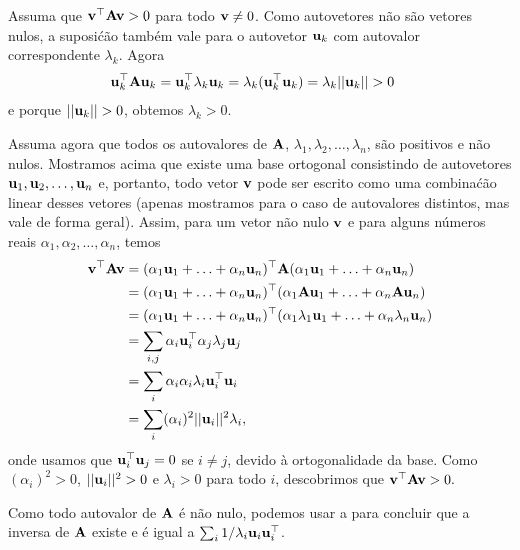 \begin{exenumerate}
    \begin{solution}
        
        Assuma que $\mathbf{v}^\top \mathbf{A}\mathbf{v} > 0$ para todo $\mathbf{v} \neq 0$. Como autovetores n\~ao s\~ao
        vetores nulos, a suposi\'c\~ao tamb\'em vale para o autovetor $\mathbf{u}_k$ com
        autovalor correspondente $\lambda_k$. Agora
        \begin{align}
            \mathbf{u}_k^\top \mathbf{A}\mathbf{u}_k &= \mathbf{u}_k^\top\lambda_k\mathbf{u}_k = \lambda_k(\mathbf{u}_k^\top\mathbf{u}_k) = \lambda_k||\mathbf{u}_k|| > 0
        \end{align}
        e porque $||\mathbf{u}_k|| > 0$, obtemos $\lambda_k > 0$.
        
        Assuma agora que todos os autovalores de $\mathbf{A}$, $\lambda_1, \lambda_2, \ldots, \lambda_n$, s\~ao positivos e n\~ao nulos. Mostramos acima que existe uma base ortogonal consistindo de autovetores $\mathbf{u}_1, \mathbf{u}_2, \ldots, \mathbf{u}_n$ e, portanto, todo vetor $\mathbf{v}$ pode ser escrito como uma
        combina\'c\~ao linear desses vetores (apenas mostramos para o caso de autovalores distintos, mas vale de forma geral). Assim, para um vetor n\~ao nulo $\mathbf{v}$ e para alguns n\'umeros reais $\alpha_1, \alpha_2, \ldots, \alpha_n$, temos
        \begin{align}
            \mathbf{v}^\top\mathbf{A}\mathbf{v} &= (\alpha_1\mathbf{u}_1 + \ldots + \alpha_n\mathbf{u}_n)^\top \mathbf{A}(\alpha_1\mathbf{u}_1 + \ldots + \alpha_n\mathbf{u}_n) \\
            &= (\alpha_1\mathbf{u}_1 + \ldots + \alpha_n\mathbf{u}_n)^\top(\alpha_1\mathbf{A}\mathbf{u}_1 + \ldots + \alpha_n\mathbf{A}\mathbf{u}_n) \\
            &= (\alpha_1\mathbf{u}_1 + \ldots + \alpha_n\mathbf{u}_n)^\top(\alpha_1\lambda_1\mathbf{u}_1 + \ldots + \alpha_n\lambda_n\mathbf{u}_n) \\
            &= \sum_{i,j} \alpha_i\mathbf{u}_i^\top\alpha_j\lambda_j\mathbf{u}_j \\
            &= \sum_i \alpha_i\alpha_i\lambda_i\mathbf{u}_i^\top\mathbf{u}_i \\
            &= \sum_i (\alpha_i)^2||\mathbf{u}_i||^2\lambda_i,
        \end{align}
        onde usamos que $\mathbf{u}_i^\top\mathbf{u}_j = 0$ se $i \neq j$, devido \`a ortogonalidade da base. Como $(\alpha_i)^2 > 0$, $||\mathbf{u}_i||^2 > 0$ e $\lambda_i > 0$ para todo $i$, descobrimos que $\mathbf{v}^\top\mathbf{A}\mathbf{v} > 0.$
        
        Como todo autovalor de $\mathbf{A}$ \'e n\~ao nulo, podemos usar a  para concluir que a inversa de $\mathbf{A}$ existe e \'e igual a $\sum_i 1/\lambda_i \mathbf{u}_i \mathbf{u}_i^\top$.
        
    \end{solution}
    
\end{exenumerate}


